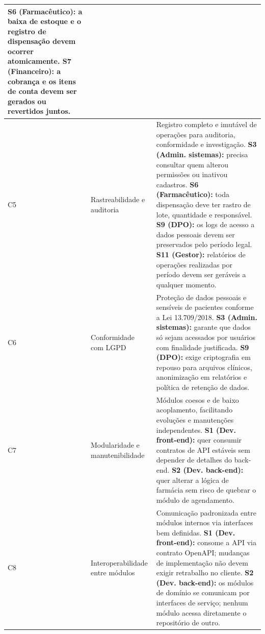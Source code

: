 \begin{longtable}{|l|l|p{9.5cm}|}
\newline\textbf{S6 (Farmacêutico):} a baixa de estoque e o registro de dispensação devem ocorrer atomicamente.
\newline\textbf{S7 (Financeiro):} a cobrança e os itens de conta devem ser gerados ou revertidos juntos. \\
\hline
C5 & Rastreabilidade e auditoria &
Registro completo e imutável de operações para auditoria, conformidade e investigação.
\newline\textbf{S3 (Admin. sistemas):} precisa consultar quem alterou permissões ou inativou cadastros.
\newline\textbf{S6 (Farmacêutico):} toda dispensação deve ter rastro de lote, quantidade e responsável.
\newline\textbf{S9 (DPO):} os logs de acesso a dados pessoais devem ser preservados pelo período legal.
\newline\textbf{S11 (Gestor):} relatórios de operações realizadas por período devem ser geráveis a qualquer momento. \\
\hline
C6 & Conformidade com LGPD &
Proteção de dados pessoais e sensíveis de pacientes conforme a Lei 13.709/2018.
\newline\textbf{S3 (Admin. sistemas):} garante que dados só sejam acessados por usuários com finalidade justificada.
\newline\textbf{S9 (DPO):} exige criptografia em repouso para arquivos clínicos, anonimização em relatórios e política de retenção de dados. \\
\hline
C7 & Modularidade e manutenibilidade &
Módulos coesos e de baixo acoplamento, facilitando evoluções e manutenções independentes.
\newline\textbf{S1 (Dev. front-end):} quer consumir contratos de API estáveis sem depender de detalhes do back-end.
\newline\textbf{S2 (Dev. back-end):} quer alterar a lógica de farmácia sem risco de quebrar o módulo de agendamento. \\
\hline
C8 & Interoperabilidade entre módulos &
Comunicação padronizada entre módulos internos via interfaces bem definidas.
\newline\textbf{S1 (Dev. front-end):} consome a API via contrato OpenAPI; mudanças de implementação não devem exigir retrabalho no cliente.
\newline\textbf{S2 (Dev. back-end):} os módulos de domínio se comunicam por interfaces de serviço; nenhum módulo acessa diretamente o repositório de outro. \\

\end{longtable}
